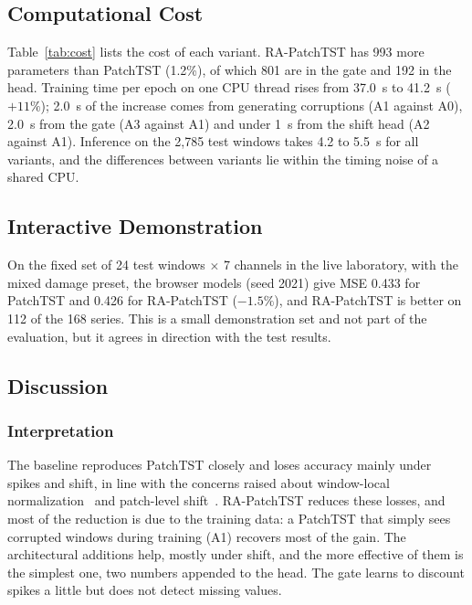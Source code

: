 \subsection{Computational Cost}

Table~\ref{tab:cost} lists the cost of each variant. RA-PatchTST has 993 more parameters than PatchTST (1.2\%), of which 801 are in the gate and 192 in the head. Training time per epoch on one CPU thread rises from 37.0~s to 41.2~s ($+11\%$); 2.0~s of the increase comes from generating corruptions (A1 against A0), 2.0~s from the gate (A3 against A1) and under 1~s from the shift head (A2 against A1). Inference on the 2,785 test windows takes 4.2 to 5.5~s for all variants, and the differences between variants lie within the timing noise of a shared CPU.

\begin{table}[!t]
\centering
\caption{Model Size and Cost (Training Time on One CPU Thread; Inference Over 2,785 Test Windows)}
\label{tab:cost}
\footnotesize
{}
\end{table}

\subsection{Interactive Demonstration}

On the fixed set of 24 test windows $\times$ 7 channels in the live laboratory, with the mixed damage preset, the browser models (seed 2021) give MSE 0.433 for PatchTST and 0.426 for RA-PatchTST ($-1.5\%$), and RA-PatchTST is better on 112 of the 168 series. This is a small demonstration set and not part of the evaluation, but it agrees in direction with the test results.

\subsection{Discussion}

\subsubsection{Interpretation}
The baseline reproduces PatchTST closely and loses accuracy mainly under spikes and shift, in line with the concerns raised about window-local normalization~\cite{fan,apt,revinrole} and patch-level shift~\cite{tfps}. RA-PatchTST reduces these losses, and most of the reduction is due to the training data: a PatchTST that simply sees corrupted windows during training (A1) recovers most of the gain. The architectural additions help, mostly under shift, and the more effective of them is the simplest one, two numbers appended to the head. The gate learns to discount spikes a little but does not detect missing values.

